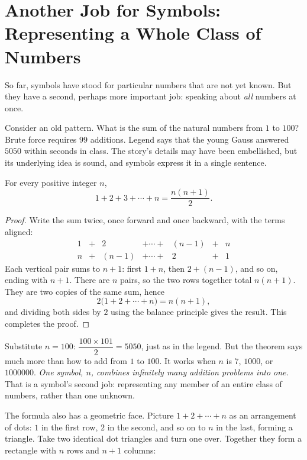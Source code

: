 \section{Another Job for Symbols: Representing a Whole Class of Numbers}

So far, symbols have stood for particular numbers that are not yet known. But they have a second, perhaps more important job: speaking about \emph{all} numbers at once.

Consider an old pattern. What is the sum of the natural numbers from $1$ to $100$? Brute force requires $99$ additions. Legend says that the young Gauss answered $5050$ within seconds in class. The story's details may have been embellished, but its underlying idea is sound, and symbols express it in a single sentence.

\begin{dingli}
For every positive integer $n$,
\[
1+2+3+\cdots+n=\frac{n(n+1)}{2}.
\]
\end{dingli}

\begin{proof}
Write the sum twice, once forward and once backward, with the terms aligned:
\[
\begin{array}{ccccccc}
1 & + & 2 & + \cdots + & (n-1) & + & n\\
n & + & (n-1) & + \cdots + & 2 & + & 1
\end{array}
\]
Each vertical pair sums to $n+1$: first $1+n$, then $2+(n-1)$, and so on, ending with $n+1$. There are $n$ pairs, so the two rows together total $n(n+1)$. They are two copies of the same sum, hence
\[
2\bigl(1+2+\cdots+n\bigr)=n(n+1),
\]
and dividing both sides by $2$ using the balance principle gives the result. This completes the proof.
\end{proof}

Substitute $n=100$: $\dfrac{100\times101}{2}=5050$, just as in the legend. But the theorem says much more than how to add from $1$ to $100$. It works when $n$ is $7$, $1000$, or $1000000$. \emph{One symbol, $n$, combines infinitely many addition problems into one.} That is a symbol's second job: representing any member of an entire class of numbers, rather than one unknown.

The formula also has a geometric face. Picture $1+2+\cdots+n$ as an arrangement of dots: $1$ in the first row, $2$ in the second, and so on to $n$ in the last, forming a triangle. Take two identical dot triangles and turn one over. Together they form a rectangle with $n$ rows and $n+1$ columns:

